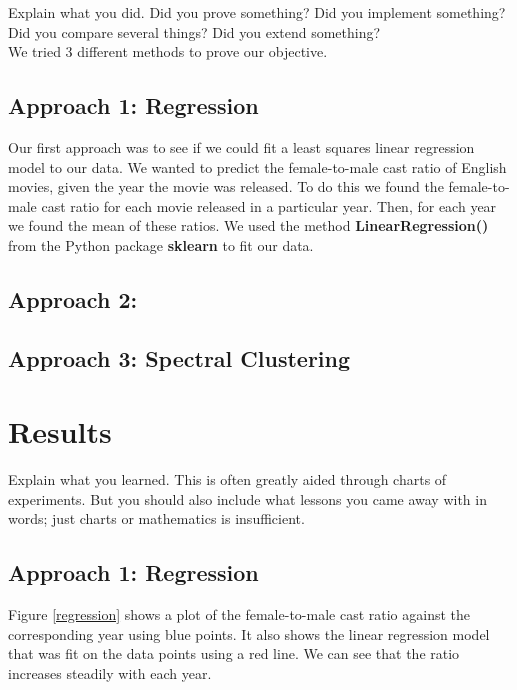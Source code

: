 \documentclass[12pt]{article}
\begin{document}
Explain what you did. Did you prove something? Did you implement something? Did you compare several things? Did you extend something? \\

We tried 3 different methods to prove our objective.

\subsection{Approach 1: Regression}
Our first approach was to see if we could fit a least squares linear regression model to our data. We wanted to predict the female-to-male cast ratio of English movies, given the year the movie was released. To do this we found the female-to-male cast ratio for each movie released in a particular year. Then, for each year we found the mean of these ratios. We used the method \textbf{LinearRegression()} from the Python package \textbf{sklearn} to fit our data.

\subsection{Approach 2: }

\subsection{Approach 3: Spectral Clustering}


\section{Results}

Explain what you learned. This is often greatly aided through charts of experiments. But you should also include what lessons you came away with in words; just charts or mathematics is insufficient.

\subsection{Approach 1: Regression}

Figure \ref{regression} shows a plot of the female-to-male cast ratio against the corresponding year using blue points. It also shows the linear regression model that was fit on the data points using a red line. We can see that the ratio increases steadily with each year.
\end{document}
